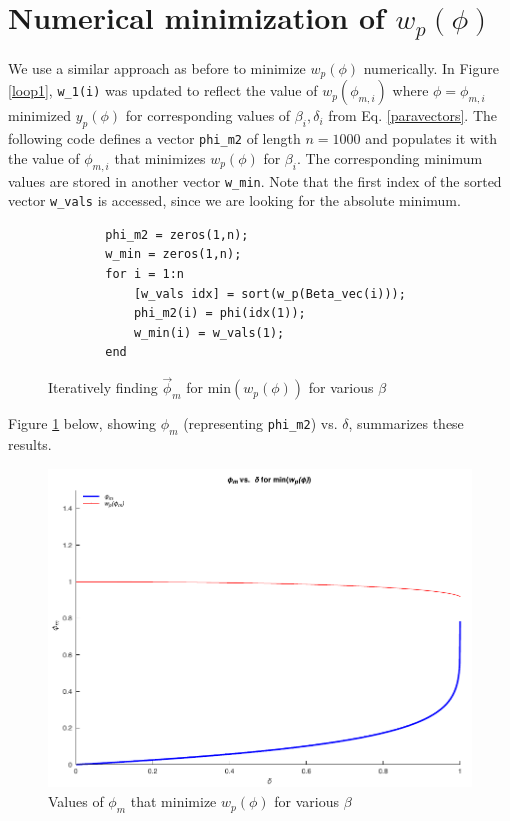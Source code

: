 \section{Numerical minimization of \texorpdfstring{$w_p(\phi)$}{}}

We use a similar approach as before to minimize $w_p(\phi)$ numerically. 
In Figure \ref{loop1}, \verb|w_1(i)| was updated
to reflect the value of $w_p(\phi_{m,i})$ where $\phi=\phi_{m,i}$ minimized $y_p(\phi)$ for corresponding values of $\beta_i,\delta_i$
from Eq. \ref{paravectors}. The following code defines a vector \verb|phi_m2| of length $n=1000$ and populates it with the value of $\phi_{m,i}$ that minimizes $w_p(\phi)$ for $\beta_i$.
The corresponding minimum values are stored in another vector \verb|w_min|. Note that the first index of the sorted vector \verb|w_vals| is accessed, since we are looking for the absolute minimum.

\begin{figure}[H]
    \begin{verbatim}
        phi_m2 = zeros(1,n);
        w_min = zeros(1,n);
        for i = 1:n
            [w_vals idx] = sort(w_p(Beta_vec(i)));
            phi_m2(i) = phi(idx(1));
            w_min(i) = w_vals(1);
        end
    \end{verbatim}
    \caption{Iteratively finding $\vec\phi_m$ for $\mathrm{min}(w_p(\phi))$ for various $\beta$}
\end{figure}

Figure \ref{wminplot} below, showing $\phi_m$ (representing \verb|phi_m2|) vs. $\delta$, summarizes these results.

\begin{figure}[H]
    \includegraphics{problem-b/plots/phi_delta_min.pdf}
    \caption{Values of $\phi_m$ that minimize $w_p(\phi)$ for various $\beta$}\label{wminplot}
\end{figure}